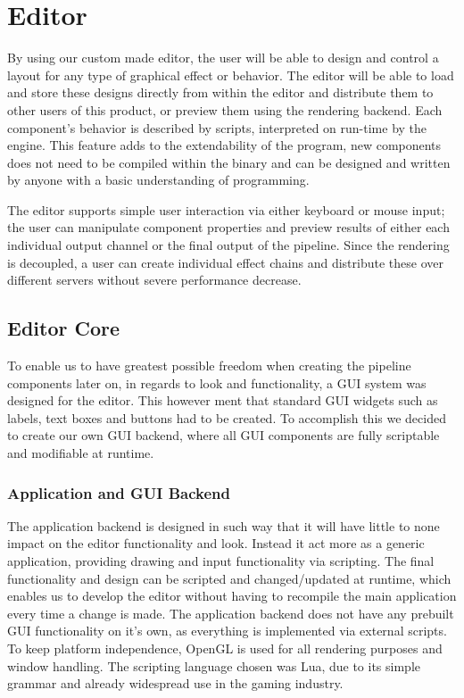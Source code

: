 
\chapter{Editor}
 
By using our custom made editor, the user will be able to design and control a layout for any type of graphical effect or behavior. 
The editor will be able to load and store these designs directly from within the editor and distribute them to other users of this product, or preview them using the rendering backend. 
Each component’s behavior is described by scripts, interpreted on run-time by the engine. This feature adds to the extendability of the program, new components does not need to be compiled within the binary and can be designed and written by anyone with a basic understanding of programming.

The editor supports simple user interaction via either keyboard or mouse input; the user can manipulate component properties and preview results of either each individual output channel or the final output of the pipeline. Since the rendering is decoupled, a user can create individual effect chains and distribute these over different servers without severe performance decrease. 

\section{Editor Core}
To enable us to have greatest possible freedom when creating the pipeline components later on, in regards to look and functionality, a GUI system was designed for the editor.
This however ment that standard GUI widgets such as labels, text boxes and buttons had to be created. To accomplish this we decided to create our own GUI backend, where all GUI components are fully scriptable and modifiable at runtime. 

\subsection{Application and GUI Backend}
The application backend is designed in such way that it will have little to none impact on the editor functionality and look. Instead it act more as a generic application, providing drawing and input functionality via scripting. The final functionality and design can be scripted and changed/updated at runtime, which enables us to develop the editor without having to recompile the main application every time a change is made. The application backend does not have any prebuilt GUI functionality on it's own, as everything is implemented via external scripts. To keep platform independence, OpenGL is used for all rendering purposes and window handling. The scripting language chosen was Lua, due to its simple grammar and already widespread use in the gaming industry.

